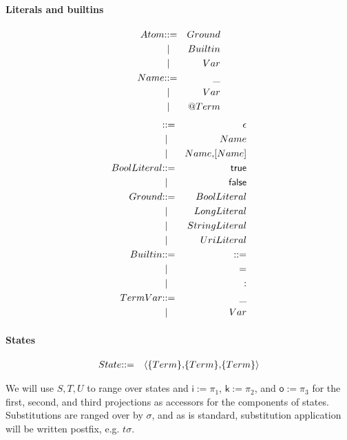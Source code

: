 \paragraph{Literals and builtins}
\begin{eqnarray*}
  Atom & \mathbin{\mathbf{::=}} & Ground \\
  & \;\mathbin{\mathbf\mid} \; & Builtin \\
  & \;\mathbin{\mathbf\mid} \; & Var \\
  Name & \mathbin{\mathbf{::=}} & \mathsf{\_} \\
  & \;\mathbin{\mathbf\mid} \; & Var \\
  & \;\mathbin{\mathbf\mid} \; & \mathsf{@} Term
\end{eqnarray*}
\begin{eqnarray*}  
  [Name] & \bc & \epsilon \\
  & \;\bm \; & Name \\
  & \;\bm \; & Name \mathsf{,} [Name] \\
  BoolLiteral & \bc & \mathsf{true} \\
 & \;\bm \; & \mathsf{false} \\
  Ground & \bc & BoolLiteral \\
  & \;\bm \; & LongLiteral \\
  & \;\bm \; & StringLiteral \\
  & \;\bm \; & UriLiteral \\
  Builtin & \bc & \mathsf{\bc} \\
 & \;\bm \; & \mathsf{=} \\
 & \;\bm \; & \mathsf{:} \\
  TermVar & \bc & \mathsf{\_} \\
  & \;\bm \; & Var \\
\end{eqnarray*}

\paragraph{States}
\begin{eqnarray*}
  State & \mathbin{\mathbf{::=}} & \langle \mathsf{\{}Term\mathsf{\}} \mathsf{,} \mathsf{\{}Term\mathsf{\}} \mathsf{,} \mathsf{\{}Term\mathsf{\}} \rangle
\end{eqnarray*}

We will use $S, T, U$ to range over states and $\mathsf{i} := \pi_{1}$, $\mathsf{k} := \pi_{2}$, and $\mathsf{o} := \pi_{3}$ for the first, second, and third projections as accessors for the components of states. Substitutions are ranged over by $\sigma$, and as is standard, substitution application will be written postfix, e.g. $t\sigma$.

